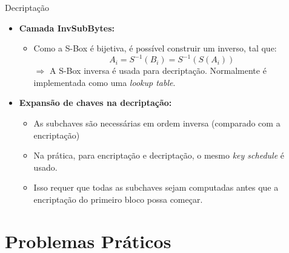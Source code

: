 \documentclass{beamer}
\begin{document}
\begin{frame}{Decriptação}

\begin{itemize}
    \item \textbf{Camada InvSubBytes:}
    \begin{itemize}
        \item Como a S-Box é bijetiva, é possível construir um inverso, tal que:
        \[
        A_i = S^{-1}(B_i) = S^{-1}(S(A_i))
        \]
        $\Rightarrow$ A S-Box inversa é usada para decriptação. Normalmente é implementada como uma \textit{lookup table}.
    \end{itemize}

    \vspace{1em}

    \item \textbf{Expansão de chaves na decriptação:}
    \begin{itemize}
        \item As subchaves são necessárias em ordem inversa (comparado com a encriptação)
        \item Na prática, para encriptação e decriptação, o mesmo \textit{key schedule} é usado.\\
        \item Isso requer que todas as subchaves sejam computadas antes que a encriptação do primeiro bloco possa começar.
    \end{itemize}
\end{itemize}

\end{frame}

\section{Problemas Práticos}
\end{document}
